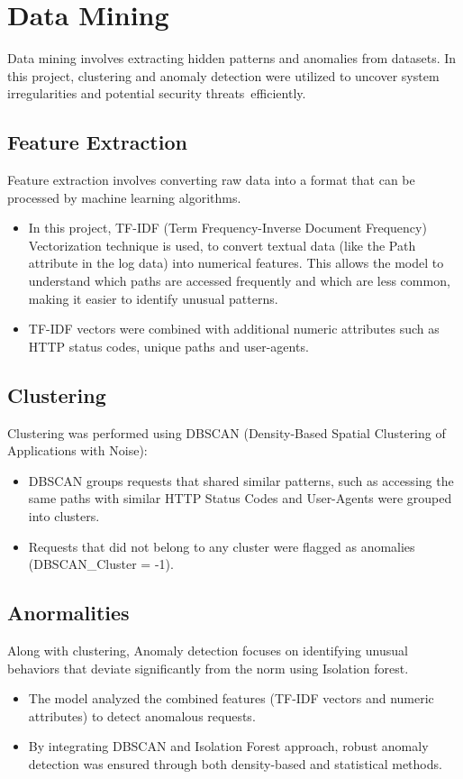 \section{Data Mining}
Data mining involves extracting hidden patterns and anomalies from datasets. In this project, clustering and anomaly detection were utilized to uncover system irregularities and potential security threats efficiently.
\subsection{Feature Extraction}
Feature extraction involves converting raw data into a format that can be processed by machine learning algorithms.
\begin{itemize}
	\item In this project, TF-IDF (Term Frequency-Inverse Document Frequency) Vectorization technique is used, to convert textual data (like the Path attribute in the log data) into numerical features. This allows the model to understand which paths are accessed frequently and which are less common, making it easier to identify unusual patterns.
	\item TF-IDF vectors were combined with additional numeric attributes such as HTTP status codes, unique paths and user-agents.
\end{itemize}

\subsection{Clustering}
Clustering was performed using DBSCAN (Density-Based Spatial Clustering of Applications with Noise):
\begin{itemize}
	\item DBSCAN groups requests that shared similar patterns, such as accessing the same paths with similar HTTP Status Codes and User-Agents were grouped into clusters.
	\item Requests that did not belong to any cluster were flagged as anomalies (DBSCAN\_Cluster = -1).
\end{itemize}

\subsection{Anormalities}
Along with clustering, Anomaly detection focuses on identifying unusual behaviors that deviate significantly from the norm using Isolation forest.
\begin{itemize}
	\item The model analyzed the combined features (TF-IDF vectors and numeric attributes) to detect anomalous requests.
	\item By integrating DBSCAN and Isolation Forest approach, robust anomaly detection was ensured through both density-based and statistical methods.
\end{itemize}



